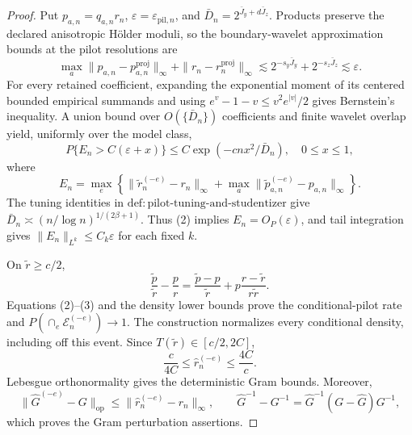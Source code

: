 \documentclass{article}
\begin{document}
\begin{proof}
Put \(p_{a,n}=q_{a,n}r_n\), \(\varepsilon=\varepsilon_{\mathrm{pil},n}\), and \(\bar D_n=2^{\bar J_y+d\bar J_z}\). Products preserve the declared anisotropic H\"older moduli, so the boundary-wavelet approximation bounds at the pilot resolutions are
\[
\max_a\|p_{a,n}-p_{a,n}^{\mathrm{proj}}\|_\infty
+\|r_n-r_n^{\mathrm{proj}}\|_\infty
\lesssim2^{-s_y\bar J_y}+2^{-s_z\bar J_z}\lesssim\varepsilon.   \tag{1}
\]
For every retained coefficient, expanding the exponential moment of its centered bounded empirical summands and using \(e^v-1-v\le v^2e^{|v|}/2\) gives Bernstein's inequality. A union bound over \(O(\{\bar D_n\})\) coefficients and finite wavelet overlap yield, uniformly over the model class,
\[
P\{E_n>C(\varepsilon+x)\}\le C\exp(-cnx^2/\bar D_n),
\quad 0\le x\le1,                                                \tag{2}
\]
where
\[
E_n=\max_e\left\{\|\widetilde r_n^{(-e)}-r_n\|_\infty
+\max_a\|\widetilde p_{a,n}^{(-e)}-p_{a,n}\|_\infty\right\}.
\]
The tuning identities in \(\mathrm{def{:}pilot\text{-}tuning\text{-}and\text{-}studentizer}\) give \(\bar D_n\asymp(n/\log n)^{1/(2\beta+1)}\). Thus (2) implies \(E_n=O_P(\varepsilon)\), and tail integration gives \(\|E_n\|_{L^k}\le C_k\varepsilon\) for each fixed \(k\).

On \(\widetilde r\ge c/2\),
\[
\frac{\widetilde p}{\widetilde r}-\frac pr
=\frac{\widetilde p-p}{\widetilde r}
+p\frac{r-\widetilde r}{r\widetilde r}.                          \tag{3}
\]
Equations (2)--(3) and the density lower bounds prove the conditional-pilot rate and \(P(\cap_e\mathcal E_n^{(-e)})\to1\). The construction normalizes every conditional density, including off this event. Since \(T(\widetilde r)\in[c/2,2C]\),
\[
\frac c{4C}\le\widehat r_n^{(-e)}\le\frac{4C}{c}.              \tag{4}
\]
Lebesgue orthonormality gives the deterministic Gram bounds. Moreover,
\[
\|\widehat G^{(-e)}-G\|_{\mathrm{op}}
\le\|\widehat r_n^{(-e)}-r_n\|_\infty,
\qquad
\widehat G^{-1}-G^{-1}=\widehat G^{-1}(G-\widehat G)G^{-1},      \tag{5}
\]
which proves the Gram perturbation assertions.


\end{proof}
\end{document}
